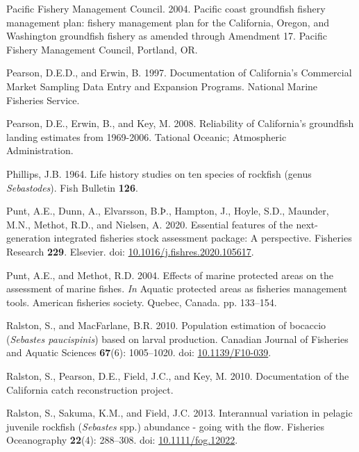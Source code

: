 \documentclass[
  english,
  a4paper,
]{article}
\newlength{\cslhangindent}
\newlength{\cslentryspacingunit} %
\newenvironment{CSLReferences}[2] %
 {%
  \setlength{\parindent}{0pt}
  \ifodd #1
  \let\oldpar\par
  \def\par{\hangindent=\cslhangindent\oldpar}
  \fi
  \setlength{\parskip}{#2\cslentryspacingunit}
 }%
 {}
\begin{document}
\begin{CSLReferences}{1}{0}
\leavevmode{}%
Pacific Fishery Management Council. 2004. {Pacific coast groundfish fishery management plan: fishery management plan for the California, Oregon, and Washington groundfish fishery as amended through Amendment 17}. Pacific Fishery Management Council, Portland, OR.

\leavevmode{}%
Pearson, D.E.D., and Erwin, B. 1997. {Documentation of California's Commercial Market Sampling Data Entry and Expansion Programs}. National Marine Fisheries Service.

\leavevmode{}%
Pearson, D.E., Erwin, B., and Key, M. 2008. {Reliability of California's groundfish landing estimates from 1969-2006}. Tational Oceanic; Atmospheric Administration.

\leavevmode{}%
Phillips, J.B. 1964. {Life history studies on ten species of rockfish (genus \emph{Sebastodes})}. Fish Bulletin \textbf{126}.

\leavevmode{}%
Punt, A.E., Dunn, A., Elvarsson, B.Þ., Hampton, J., Hoyle, S.D., Maunder, M.N., Methot, R.D., and Nielsen, A. 2020. {Essential features of the next-generation integrated fisheries stock assessment package: A perspective}. Fisheries Research \textbf{229}. Elsevier. doi: \href{https://doi.org/10.1016/j.fishres.2020.105617}{10.1016/j.fishres.2020.105617}.

\leavevmode{}%
Punt, A.E., and Methot, R.D. 2004. {Effects of marine protected areas on the assessment of marine fishes}. \emph{In} Aquatic protected areas as fisheries management tools. American fisheries society. Quebec, Canada. pp. 133--154.

\leavevmode{}%
Ralston, S., and MacFarlane, B.R. 2010. {Population estimation of bocaccio (\emph{Sebastes paucispinis}) based on larval production}. Canadian Journal of Fisheries and Aquatic Sciences \textbf{67}(6): 1005--1020. doi: \href{https://doi.org/10.1139/F10-039}{10.1139/F10-039}.

\leavevmode{}%
Ralston, S., Pearson, D.E., Field, J.C., and Key, M. 2010. {Documentation of the California catch reconstruction project}.

\leavevmode{}%
Ralston, S., Sakuma, K.M., and Field, J.C. 2013. {Interannual variation in pelagic juvenile rockfish (\emph{Sebastes} spp.) abundance - going with the flow}. Fisheries Oceanography \textbf{22}(4): 288--308. doi: \href{https://doi.org/10.1111/fog.12022}{10.1111/fog.12022}.


\end{CSLReferences}
\end{document}
